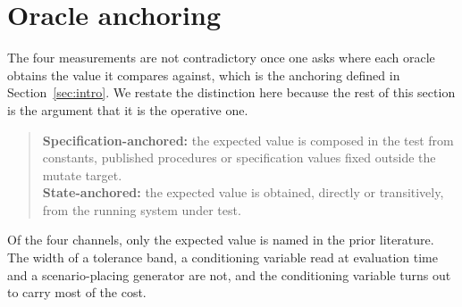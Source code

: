 \documentclass[12pt]{article}
\begin{document}
\section{Oracle anchoring}
\label{sec:anchoring}

The four measurements are not contradictory once one asks where each oracle
obtains the value it compares against, which is the anchoring defined in
Section~\ref{sec:intro}. We restate the distinction here because the rest of this
section is the argument that it is the operative one.

\begin{quote}
\textbf{Specification-anchored:} the expected value is composed in the test from
constants, published procedures or specification values fixed outside the mutate
target.\\
\textbf{State-anchored:} the expected value is obtained, directly or transitively,
from the running system under test.
\end{quote}

Of the four channels, only the expected value is named in the prior literature.
The width of a tolerance band, a conditioning variable read at evaluation time and
a scenario-placing generator are not, and the conditioning variable turns out to
carry most of the cost.
\end{document}
